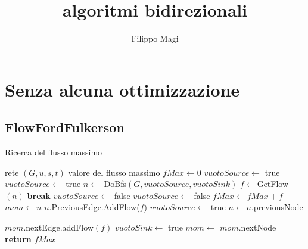 \documentclass{article}
\title{algoritmi bidirezionali}
\author{Filippo Magi }
\begin{document}
\maketitle
\section{Senza alcuna ottimizzazione}
\subsection{FlowFordFulkerson}
\begin{algorithm}
    \caption{Ricerca del flusso massimo}
    \begin{algorithmic}[1]
        \REQUIRE rete $(G,u,s,t)$
        \ENSURE valore del flusso massimo
        \STATE $fMax \leftarrow 0$
        \STATE$ vuotoSource \leftarrow$ true
        \STATE $vuotoSource \leftarrow$ true
        \STATE $n \leftarrow$ DoBfs$(G,vuotoSource,vuotoSink)$
        \STATE $f \leftarrow $GetFlow$(n)$ 
        \STATE \textbf{break}
        \ENDIF
        \STATE $vuotoSource \leftarrow$ false
        \STATE $vuotoSource \leftarrow$ false
        \STATE $fMax \leftarrow fMax + f$
        \STATE $mom \leftarrow n$
        \STATE $n$.PreviousEdge.AddFlow($f$)
        \STATE $vuotoSource \leftarrow$ true
        \ENDIF
        \STATE $n \leftarrow n.$previousNode
        \ENDWHILE

        \STATE $mom.$nextEdge.addFlow$(f)$
        \STATE $vuotoSink \leftarrow$ true
        \ENDIF
        \STATE $mom \leftarrow$ $mom.$nextNode
        \ENDWHILE
        \ENDWHILE
        \STATE \textbf{return} $fMax$
    \end{algorithmic}
\end{algorithm}
\end{document}
